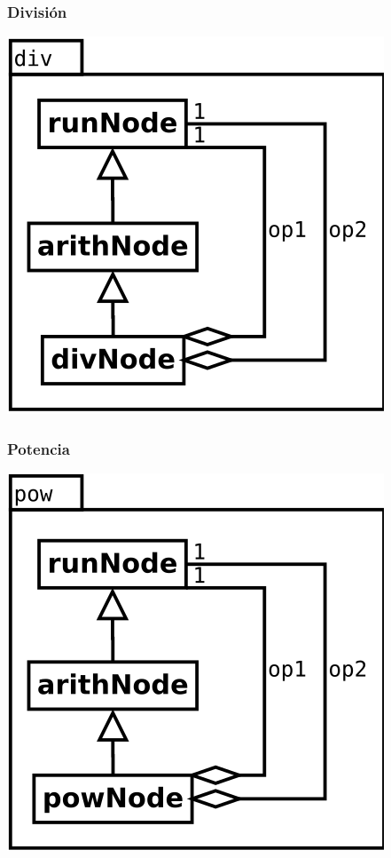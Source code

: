 \subsubsection {División}
\begin{center}
\includegraphics[scale=0.4]{div.png} \\
\end{center}

\subsubsection {Potencia}
\begin{center}
\includegraphics[scale=0.4]{pow.png} \\
\end{center}


